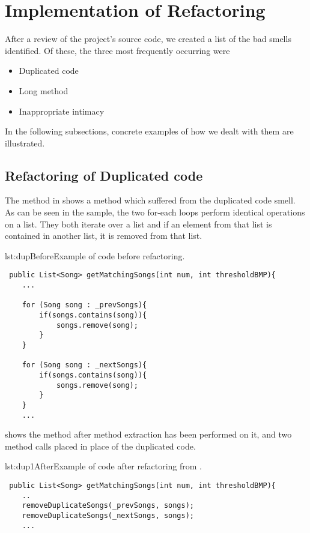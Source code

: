 \section{Implementation of Refactoring}
After a review of the project's source code, we created a list of the bad smells identified. Of these, the three most frequently occurring were
\begin{itemize}
\item Duplicated code
\item Long method
\item Inappropriate intimacy
\end{itemize}

In the following subsections, concrete examples of how we dealt with them are illustrated. 
\subsection{Refactoring of Duplicated code}
The method in  shows a method which suffered from the duplicated code smell. As can be seen in the sample, the two for-each loops perform identical operations on a list. They both iterate over a list and if an element from that list is contained in another list, it is removed from that list.

\begin{code}{lst:dupBefore}{Example of code before refactoring.}
\begin{lstlisting}
 public List<Song> getMatchingSongs(int num, int thresholdBMP){
    ...

    for (Song song : _prevSongs){
        if(songs.contains(song)){
            songs.remove(song);
        }
    }

    for (Song song : _nextSongs){
        if(songs.contains(song)){
            songs.remove(song);
        }
    }
    ...
\end{lstlisting}
\end{code}

 shows the method after method extraction has been performed on it, and two method calls placed in place of the duplicated code.

\begin{code}{lst:dup1After}{Example of code after refactoring from .}
\begin{lstlisting}
 public List<Song> getMatchingSongs(int num, int thresholdBMP){
    ..
    removeDuplicateSongs(_prevSongs, songs);
    removeDuplicateSongs(_nextSongs, songs);
    ...
\end{lstlisting}
\end{code}

